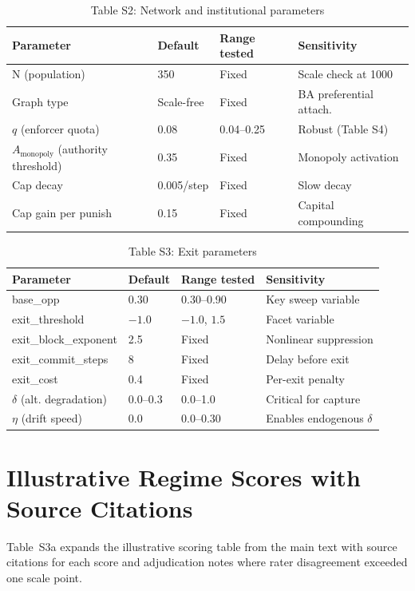 \documentclass[12pt]{article}
\begin{document}
\begin{table}[h]
\centering
\caption{Table S2: Network and institutional parameters}
\begin{tabular}{llll}
\toprule
Parameter & Default & Range tested & Sensitivity \\
\midrule
N (population) & 350 & Fixed & Scale check at 1000 \\
Graph type & Scale-free & Fixed & BA preferential attach. \\
$q$ (enforcer quota) & 0.08 & 0.04--0.25 & Robust (Table S4) \\
$A_{\text{monopoly}}$ (authority threshold) & 0.35 & Fixed & Monopoly activation \\
Cap decay & 0.005/step & Fixed & Slow decay \\
Cap gain per punish & 0.15 & Fixed & Capital compounding \\
\bottomrule
\end{tabular}
\end{table}

\begin{table}[h]
\centering
\caption{Table S3: Exit parameters}
\begin{tabular}{llll}
\toprule
Parameter & Default & Range tested & Sensitivity \\
\midrule
base\_opp & 0.30 & 0.30--0.90 & Key sweep variable \\
exit\_threshold & $-1.0$ & $-1.0$, $1.5$ & Facet variable \\
exit\_block\_exponent & 2.5 & Fixed & Nonlinear suppression \\
exit\_commit\_steps & 8 & Fixed & Delay before exit \\
exit\_cost & 0.4 & Fixed & Per-exit penalty \\
$\delta$ (alt. degradation) & 0.0--0.3 & 0.0--1.0 & Critical for capture \\
$\eta$ (drift speed) & 0.0 & 0.0--0.30 & Enables endogenous $\delta$ \\
\bottomrule
\end{tabular}
\end{table}


\section{Illustrative Regime Scores with Source Citations}

Table~S3a expands the illustrative scoring table from the main text with source citations for each score and adjudication notes where rater disagreement exceeded one scale point.
\end{document}

